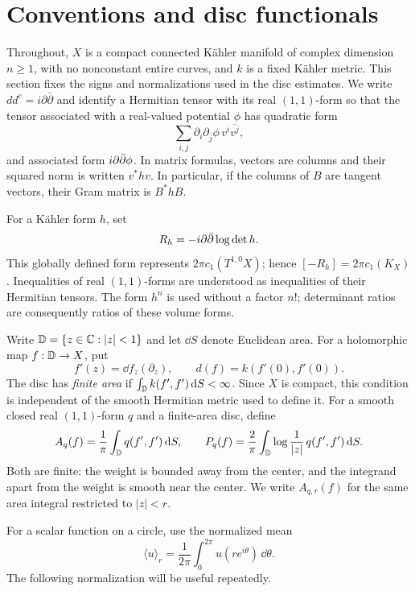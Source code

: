 \section{Conventions and disc functionals}\label{sec:preliminaries}

Throughout, $X$ is a compact connected K\"ahler manifold of complex
dimension $n\ge1$, with no nonconstant entire curves, and $k$ is a fixed
K\"ahler metric. This section fixes the signs and normalizations used
in the disc estimates. We write $dd^c=i\partial\bar\partial$ and
identify a Hermitian tensor with its real
$(1,1)$-form so that the tensor associated with a real-valued potential
$\phi$ has quadratic form
\[
 \sum_{i,j}\partial_i\partial_{\bar j}\phi\,
 v^i\overline{v^j},
\]
and associated form $i\partial\bar\partial\phi$. In matrix formulas, vectors are columns
and their squared norm is written $v^*hv$. In particular, if the columns
of $B$ are tangent vectors, their Gram matrix is $B^*hB$.

For a K\"ahler form $h$, set
\begin{equation}\label{eq:ricci-convention}
 R_h=-i\partial\bar\partial\log\det h.
\end{equation}
This globally defined form represents $2\pi c_1(T^{1,0}X)$; hence
$[-R_h]=2\pi c_1(K_X)$. Inequalities of real $(1,1)$-forms are understood
as inequalities of their Hermitian tensors. The form $h^n$ is used
without a factor $n!$; determinant ratios are consequently ratios of
these volume forms.

Write $\mathbb D=\{z\in\mathbb C:|z|<1\}$ and let $\dd S$ denote Euclidean area.
For a holomorphic map $f:\mathbb D\to X$, put
\[
 f'(z)=\dd f_z(\partial_z),\qquad d(f)=k(f'(0),f'(0)).
\]
The disc has \emph{finite area} if $\int_\mathbb D k(f',f')\,\mathrm d S<\infty$.
Since $X$ is compact, this condition is independent of the smooth
Hermitian metric used to define it. For a smooth closed real
$(1,1)$-form $q$ and a finite-area disc, define
\begin{equation}\label{eq:disc-functionals}
 A_q(f)=\frac1\pi\int_\mathbb D q(f',f')\,\mathrm d S,
 \qquad
 P_q(f)=\frac2\pi\int_\mathbb D\log\frac1{|z|}\,q(f',f')\,\mathrm d S.
\end{equation}
Both are finite: the weight is bounded away from the center, and the
integrand apart from the weight is smooth near the center. We write
$A_{q,r}(f)$ for the same area integral restricted to $|z|<r$.

For a scalar function on a circle, use the normalized mean
\[
 \langle u\rangle_r=\frac1{2\pi}\int_0^{2\pi}u(re^{i\theta})\,\dd\theta.
\]
The following normalization will be useful repeatedly.


